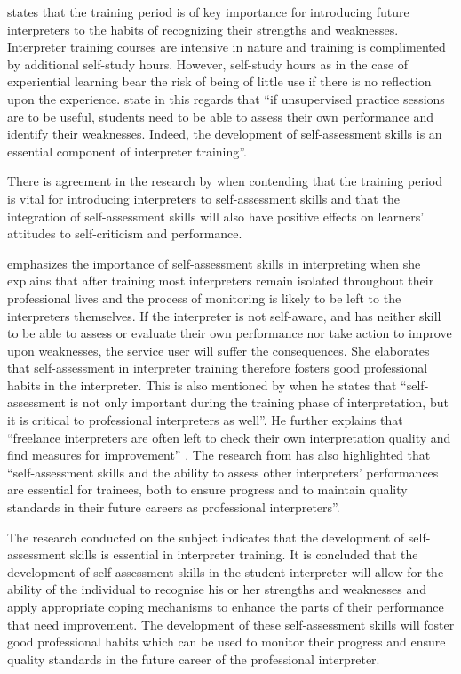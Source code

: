 \documentclass[output=paper]{langsci/langscibook}
\begin{document}
\citet{Riccardi2002} states that the training period is of key importance for introducing future interpreters to the habits of recognizing their strengths and weaknesses. Interpreter training courses are intensive in nature and training is complimented by additional self-study hours. However, self-study hours as in the case of experiential learning bear the risk of being of little use if there is no reflection upon the experience. \citet[4]{Sandrelli2007a} state in this regards that “if unsupervised practice sessions are to be useful, students need to be able to assess their own performance and identify their weaknesses. Indeed, the development of self-assessment skills is an essential component of interpreter training”. 

There is agreement in the research by \citet[197]{Pinazo2008} when contending that the training period is vital for introducing interpreters to self-assessment skills and that the integration of self-assessment skills will also have positive effects on learners’ attitudes to self-criticism and performance. 

\citet[254]{Fowler2007} emphasizes the importance of self-assessment skills in interpreting when she explains that after training most interpreters remain isolated throughout their professional lives and the process of monitoring is likely to be left to the interpreters themselves. If the interpreter is not self-aware, and has neither skill to be able to assess or evaluate their own performance nor take action to improve upon weaknesses, the service user will suffer the consequences. She elaborates that self-assessment in interpreter training therefore fosters good professional habits in the interpreter. This is also mentioned by \citet[3]{Lee2005} when he states that “self-assessment is not only important during the training phase of interpretation, but it is critical to professional interpreters as well”. He further explains that “freelance interpreters are often left to check their own interpretation quality and find measures for improvement” \citep[2]{Lee2005}. The research from \citet[15]{Sandrelli2007a} has also highlighted that “self-assessment skills and the ability to assess other interpreters’ performances are essential for trainees, both to ensure progress and to maintain quality standards in their future careers as professional interpreters”.

The research conducted on the subject \citep{Riccardi2002,Lee2005,Sandrelli2007a,Fowler2007,Pinazo2008} indicates that the development of self-assessment skills is essential in interpreter training. It is concluded that the development of self-assessment skills in the student interpreter will allow for the ability of the individual to recognise his or her strengths and weaknesses and apply appropriate coping mechanisms to enhance the parts of their performance that need improvement. The development of these self-assessment skills will foster good professional habits which can be used to monitor their progress and ensure quality standards in the future career of the professional interpreter. 
\end{document}
